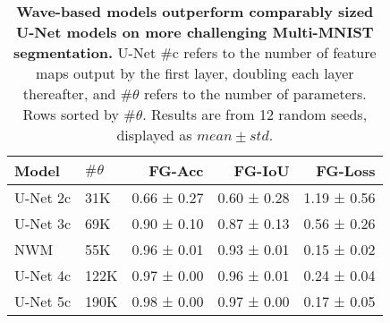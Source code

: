 \begin{table}[t]
    \centering
    \begin{tabular}{llrrr}
   \toprule
      \hspace{-2mm}  Model & $\# \theta$ & FG-Acc & FG-IoU & FG-Loss \\
    \midrule
       \hspace{-2mm} U-Net 2c \hspace{-2mm}    & 31K      & 0.66 ± 0.27 & 0.60 ± 0.28 & 1.19 ± 0.56 \\
       \hspace{-2mm} U-Net 3c  \hspace{-2mm}   & 69K      & 0.90 ± 0.10 & 0.87 ± 0.13 & 0.56 ± 0.26 \\
     \midrule
       \hspace{-2mm} NWM \hspace{-3mm} & 55K      & 0.96 ± 0.01 & 0.93 ± 0.01 & 0.15 ± 0.02 \\
    \midrule
       \hspace{-2mm} U-Net 4c  \hspace{-2mm}   & 122K     & 0.97 ± 0.00 & 0.96 ± 0.01 & 0.24 ± 0.04 \\
       \hspace{-2mm} U-Net 5c  \hspace{-2mm}   & 190K     & 0.98 ± 0.00 & 0.97 ± 0.00 & 0.17 ± 0.05 \\
     \bottomrule
    \end{tabular}
    \vspace{-1mm}
    \caption{
    \textbf{Wave-based models outperform comparably sized U-Net models on more challenging Multi-MNIST segmentation.} 
    U-Net \#c refers to the number of feature maps output by the first layer, doubling each layer thereafter, and $\# \theta$ refers to the number of parameters. Rows sorted by $\# \theta$.
    Results are from 12 random seeds, displayed as $mean \pm std$.}
    \vspace{-4mm}
    \label{tab:multi-mnist}
\end{table}